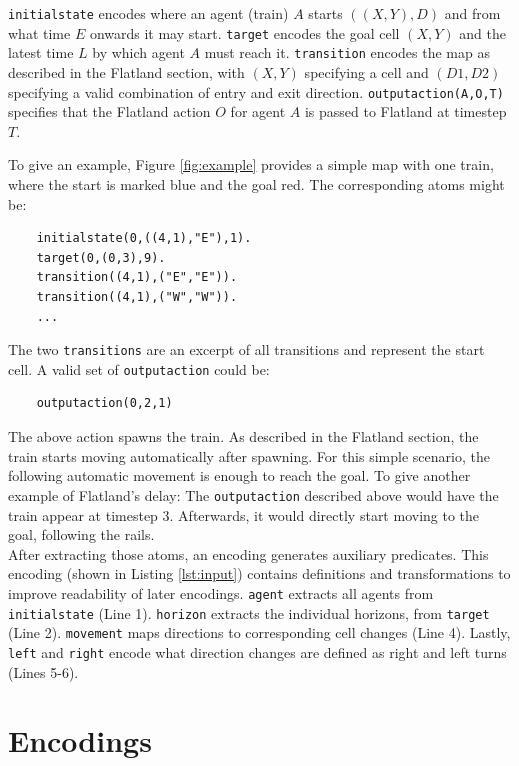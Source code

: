 \documentclass{llncs}
\begin{document}
\begin{multicols*}{2}
\texttt{initialstate} encodes where an agent (train) $A$ starts $((X,Y),D)$ and from what time $E$ onwards it may start. \texttt{target} encodes the goal cell $(X,Y)$ and the latest time $L$ by which agent $A$ must reach it. \texttt{transition} encodes the map as described in the Flatland section, with $(X,Y)$ specifying a cell and $(\mathit{D1},\mathit{D2})$ specifying a valid combination of entry and exit direction. \texttt{outputaction(A,O,T)} specifies that the Flatland action $O$ for agent $A$ is passed to Flatland at timestep $T$.

To give an example, Figure \ref{fig:example} provides a simple map with one train, where the start is marked blue and the goal red. The corresponding atoms might be:

\begin{verbatim}
    initialstate(0,((4,1),"E"),1).
    target(0,(0,3),9).
    transition((4,1),("E","E")).
    transition((4,1),("W","W")).
    ...
\end{verbatim}

The two \texttt{transitions} are an excerpt of all transitions and represent the start cell. A valid set of \texttt{outputaction} could be:

\begin{verbatim}
    outputaction(0,2,1)
\end{verbatim}

The above action spawns the train. As described in the Flatland section, the train starts moving automatically after spawning. For this simple scenario, the following automatic movement is enough to reach the goal. To give another example of Flatland's delay: The \texttt{outputaction} described above would have the train appear at timestep 3. Afterwards, it would directly start moving to the goal, following the rails.\\

After extracting those atoms, an encoding generates auxiliary predicates. This encoding (shown in Listing \ref{lst:input}) contains definitions and transformations to improve readability of later encodings. \texttt{agent} extracts all agents from \texttt{initialstate} (Line 1). \texttt{horizon} extracts the individual horizons, from \texttt{target} (Line 2). \texttt{movement} maps directions to corresponding cell changes (Line 4). Lastly, \texttt{left} and \texttt{right} encode what direction changes are defined as right and left turns (Lines 5-6).

\section*{Encodings}
\begin{figure}[t]

\end{figure}
\begin{figure}[b]

\end{figure}


\end{multicols*}
\end{document}

